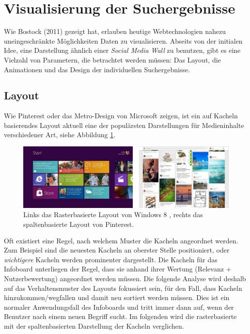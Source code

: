\documentclass[12pt,twoside]{book}
\begin{document}
\section{Visualisierung der Suchergebnisse}\label{chap:concept:wall}

 Wie Bostock (2011) gezeigt hat, erlauben heutige Webtechnologien nahezu uneingeschränkte Möglichkeiten Daten zu visualisieren. Abseits von der initialen Idee, eine Darstellung ähnlich einer \textit{Social Media Wall} zu benutzen, gibt es eine Vielzahl von Parametern, die betrachtet werden müssen: Das Layout, die Animationen und das Design der individuellen Suchergebnisse.

\subsection{Layout}

Wie Pinterest \cite{pinterest} oder das Metro-Design von Microsoft zeigen, ist ein auf Kacheln  basierendes Layout aktuell eine der populärsten Darstellungen für Medieninhalte verschiedener Art, siehe Abbildung \ref{fig:metro_pinterest}.

\begin{figure}[htbp]
    \centering
    \includegraphics[width=1.0\textwidth]{images/metro_pinterest.png}
    \caption{Links das Rasterbasierte Layout von Windows 8 \cite{metrodesign}, rechts das spaltenbasierte Layout von Pinterest.}
    \label{fig:metro_pinterest}
  \end{figure}

Oft existiert eine Regel, nach welchem Muster die Kacheln angeordnet werden. Zum Beispiel sind die neuesten Kacheln an oberster Stelle positioniert,  oder \textit{wichtigere} Kacheln werden prominenter dargestellt.  Die Kacheln für das Infoboard unterliegen der Regel, dass sie anhand ihrer Wertung (Relevanz + Nutzerbewertung) angeordnet werden müssen. Die folgende Analyse wird deshalb auf das Verhaltensmuster des Layouts fokussiert sein, für den Fall, dass Kacheln hinzukommen/wegfallen und damit neu sortiert werden müssen. Dies ist ein normaler Anwendungsfall des Infoboards und tritt immer dann auf, wenn der Benutzer nach einem neuen Begriff sucht.
Im folgenden wird die rasterbasierte mit der spaltenbasierten Darstellung der Kacheln verglichen.
\end{document}
